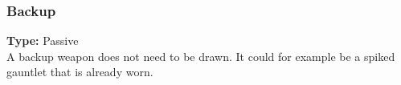 \subsubsection{Backup}
\label{iqty:backup}
\textbf{Type:} Passive\\
A backup weapon does not need to be drawn. It could for example be a spiked gauntlet that is
already worn.
